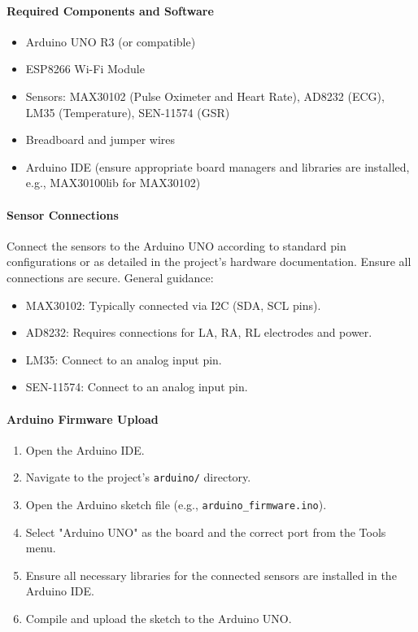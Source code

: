 \paragraph*{Required Components and Software}
\begin{itemize}
    \item Arduino UNO R3 (or compatible)
    \item ESP8266 Wi-Fi Module
    \item Sensors: MAX30102 (Pulse Oximeter and Heart Rate), AD8232 (ECG), LM35 (Temperature), SEN-11574 (GSR)
    \item Breadboard and jumper wires
    \item Arduino IDE (ensure appropriate board managers and libraries are installed, e.g., MAX30100lib for MAX30102)
\end{itemize}

\paragraph*{Sensor Connections}
Connect the sensors to the Arduino UNO according to standard pin configurations or as detailed in the project's hardware documentation. Ensure all connections are secure. General guidance:
\begin{itemize}
    \item MAX30102: Typically connected via I2C (SDA, SCL pins).
    \item AD8232: Requires connections for LA, RA, RL electrodes and power.
    \item LM35: Connect to an analog input pin.
    \item SEN-11574: Connect to an analog input pin.
\end{itemize}

\paragraph*{Arduino Firmware Upload}
\begin{enumerate}
    \item Open the Arduino IDE.
    \item Navigate to the project's \texttt{arduino/} directory.
    \item Open the Arduino sketch file (e.g., \texttt{arduino\_firmware.ino}).
    \item Select "Arduino UNO" as the board and the correct port from the Tools menu.
    \item Ensure all necessary libraries for the connected sensors are installed in the Arduino IDE.
    \item Compile and upload the sketch to the Arduino UNO.
\end{enumerate}

